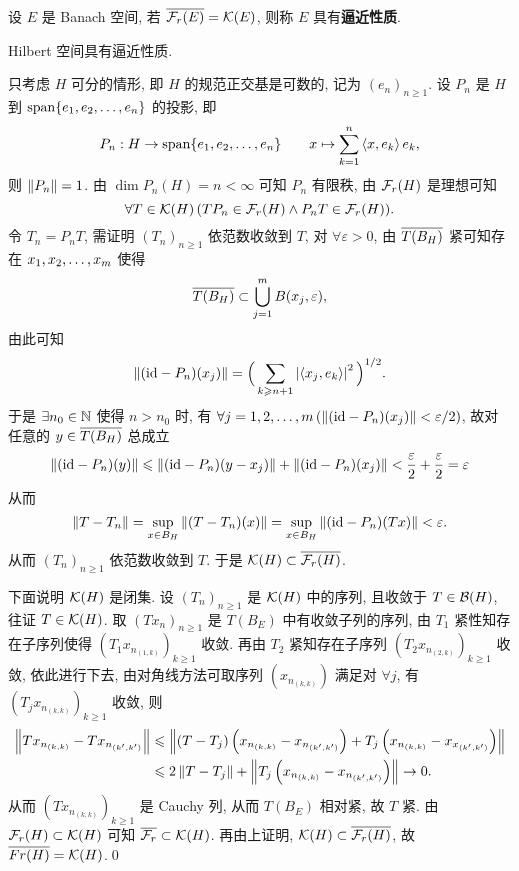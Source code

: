 	\begin{Definition}[逼近性质]\label{def:逼近性质}
		设 $ E $ 是 Banach 空间, 若 $ \baro{\Fr(E)}=\CK(E) $, 则称 $ E $ 具有\textbf{逼近性质}.
	\end{Definition}

	\begin{Theorem}
		Hilbert 空间具有逼近性质.
	\end{Theorem}
	\begin{Proof}
		只考虑 $ H $ 可分的情形, 即 $ H $ 的规范正交基是可数的, 记为 $ (e_{n})_{n\geqslant1} $. 设 $ P_{n} $ 是 $ H $ 到 $ \Span\{ \seq{e} \} $ 的投影, 即
		\[
			P_{n}: H\to\Span\{ \seq{e} \}\qquad x\mapsto \sum_{k=1}^{n}\lrangle{x, e_{k}}e_{k},
		\]
		则 $ \norm{P_{n}}=1 $. 由 $ \dim P_{n}(H)=n<\infty $ 可知 $ P_{n} $ 有限秩, 由 $ \Fr(H) $ 是理想可知
		\[
			\forall T\in\CK(H)\,(TP_{n}\in\Fr(H)\land P_{n}T\in\Fr(H)).
		\]
		令 $ T_{n}=P_{n}T $, 需证明 $ (T_{n})_{n\geqslant1} $ 依范数收敛到 $ T $, 对 $ \forall\varepsilon>0 $, 由 $ \baro{T(B_{H})} $ 紧可知存在 $ \seq[m]{x} $ 使得
		\[
			\baro{T(B_{H})}\subset\bigcup_{j=1}^{m}B(x_{j}, \varepsilon),
		\]
		由此可知
		\[
			\norm{(\id -P_{n})(x_{j})}=\Big( \sum_{k\geqslant n+1} \abs{\lrangle{x_{j}, e_{k}}}^{2} \Big)^{1/2}.
		\]
		于是 $ \exists n_{0}\in\N $ 使得 $ n>n_{0} $ 时, 有 $ \forall j= 1, 2, \dots, m\,(\norm{(\id-P_{n})(x_{j})}<\varepsilon/2) $, 故对任意的 $ y\in\baro{T(B_{H})} $ 总成立
		\[
			\norm{(\id-P_{n})(y)}\leqslant\norm{(\id-P_{n})(y-x_{j})}+\norm{(\id-P_{n})(x_{j})}<\frac{\varepsilon}{2}+\frac{\varepsilon}{2}=\varepsilon
		\]
		从而
		\[
			\norm{T-T_{n}}=\sup_{x\in B_{H}}\norm{(T-T_{n})(x)}=\sup_{x\in B_{H}}\norm{(\id-P_{n})(Tx)}<\varepsilon.
		\]
		从而 $ (T_{n})_{n\geqslant1} $ 依范数收敛到 $ T $. 于是 $ \CK(H)\subset\baro{\Fr(H)} $.

		下面说明 $ \CK(H) $ 是闭集. 设 $ (T_{n})_{n\geqslant1} $ 是 $ \CK(H) $ 中的序列, 且收敛于 $ T\in\CB(H) $, 往证 $ T\in\CK(H) $. 取 $ (Tx_{n})_{n\geqslant1} $ 是 $ T(B_{E}) $ 中有收敛子列的序列, 由 $ T_{1} $ 紧性知存在子序列使得 $ \left(T_{1}x_{n_{(1, k)}}\right)_{k\geqslant1} $ 收敛. 再由 $ T_{2} $ 紧知存在子序列 $ \left(T_{2}x_{n_{(2, k)}}\right)_{k\geqslant1} $ 收敛, 依此进行下去, 由对角线方法可取序列 $ \left(x_{n_{(k, k)}}\right) $ 满足对 $ \forall j $, 有 $ \left(T_{j}x_{n_{(k, k)}}\right)_{k\geqslant1} $ 收敛, 则
		\[
			\begin{aligned}
				\norm{Tx_{n_{(k, k)}}-Tx_{n_{(k', k')}}} & \leqslant \norm{(T-T_{j})\left(x_{n_{(k, k)}}-x_{n_{(k', k')}}\right)+T_{j}\left(x_{n_{(k, k)}}-x_{x_{(k', k')}}\right)}\\
				& \leqslant 2\norm{T-T_{j}}+\norm{T_{j}\left(x_{n_{(k, k)}}-x_{n_{(k', k')}}\right)}\to 0.
			\end{aligned}
		\] 
		从而 $ \left( Tx_{n_{(k, k)}} \right)_{k\geqslant1} $ 是 Cauchy 列, 从而 $ T(B_{E}) $ 相对紧, 故 $ T $ 紧. 由 $ \Fr(H)\subset\CK(H) $ 可知 $ \baro{\Fr}\subset \CK(H) $. 再由上证明, $ \CK(H)\subset\baro{\Fr(H)} $, 故 $ \baro{Fr(H)}=\CK(H) $.\qed
	\end{Proof}

